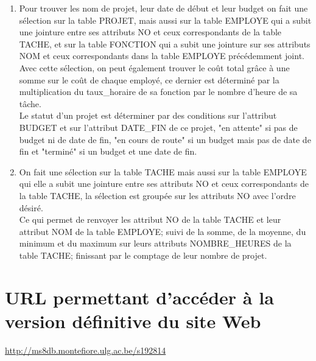 \documentclass[a4paper, 11pt]{article}
\begin{document}
\begin{enumerate}
\item
Pour trouver les nom de projet, leur date de début et leur budget on fait une sélection sur la table PROJET, mais aussi sur la table EMPLOYE qui a subit une jointure entre ses attributs NO et ceux correspondants de la table TACHE, et sur la table FONCTION qui a subit une jointure sur ses attributs NOM et ceux correspondants dans la table EMPLOYE précédemment joint.\\  
Avec cette sélection, on peut également trouver le coût total grâce à une somme sur le coût de chaque employé, ce dernier est déterminé par la multiplication du taux\_horaire de sa fonction par le nombre d'heure de sa tâche.\\
Le statut d'un projet est déterminer par des conditions sur l'attribut BUDGET et sur l'attribut DATE\_FIN de ce projet, "en attente" si pas de budget ni de date de fin, "en cours de route" si un budget mais pas de date de fin et "terminé" si un budget et une date de fin.\\

\item 
On fait une sélection sur la table TACHE mais aussi sur la table EMPLOYE qui elle a subit une jointure entre ses attributs NO et ceux correspondants de la table TACHE, la sélection est groupée sur les attributs NO avec l'ordre désiré.\\
Ce qui permet de renvoyer les attribut NO de la table TACHE et leur attribut NOM de la table EMPLOYE; suivi de la somme, de la moyenne, du minimum et du maximum sur leurs attributs NOMBRE\_HEURES de la table TACHE; finissant par le comptage de leur nombre de projet.\\

\end{enumerate}


\section{URL permettant d'accéder à la version définitive du site Web}
\url{http://ms8db.montefiore.ulg.ac.be/s192814 }
\end{document}
